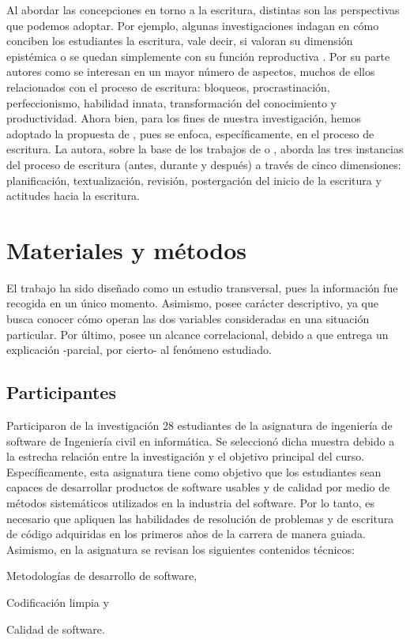 \documentclass[spanish]{textolivre}
\begin{document}
Al abordar las concepciones en torno a la escritura, distintas son las perspectivas que podemos adoptar. Por ejemplo, algunas investigaciones indagan en cómo conciben los estudiantes la escritura, vale decir, si valoran su dimensión epistémica o se quedan simplemente con su función reproductiva \cite{gonzalez2020concepciones}. Por su parte autores como \cite{lonka2014measure} se interesan en un mayor número de aspectos, muchos de ellos relacionados con el proceso de escritura: bloqueos, procrastinación, perfeccionismo, habilidad innata, transformación del conocimiento y productividad. Ahora bien, para los fines de nuestra investigación, hemos adoptado la propuesta de \textcite{vine2020escritura}, pues se enfoca, específicamente, en el proceso de escritura. La autora, sobre la base de los trabajos de \textcite{de2012hacia} o \textcite{rodriguez2015escritura}, aborda las tres instancias del proceso de escritura (antes, durante y después) a través de cinco dimensiones: planificación, textualización, revisión, postergación del inicio de la escritura y actitudes hacia la escritura. 

\section{Materiales y métodos}

El trabajo ha sido diseñado como un estudio transversal, pues la información fue recogida en un único momento. Asimismo, posee carácter descriptivo, ya que busca conocer cómo operan las dos variables consideradas en una situación particular. Por último, posee un alcance correlacional, debido a que entrega un explicación -parcial, por cierto- al fenómeno estudiado.

\subsection{Participantes}

Participaron de la investigación 28 estudiantes de la asignatura de ingeniería de software de Ingeniería civil en informática. Se seleccionó dicha muestra debido a la estrecha relación entre la investigación y el objetivo principal del curso.  Específicamente, esta asignatura tiene como objetivo que los estudiantes sean capaces de desarrollar productos de software usables y de calidad por medio de métodos sistemáticos utilizados en la industria del software. Por lo tanto, es necesario que apliquen las habilidades de resolución de problemas y de escritura de código adquiridas en los primeros años de la carrera de manera guiada. Asimismo, en la asignatura se revisan los siguientes contenidos técnicos: 
\begin{enumerate*}[label=\arabic*)]
    \item Metodologías de desarrollo de software,
    \item Codificación limpia y
    \item Calidad de software.
\end{enumerate*}
\end{document}
